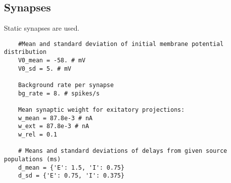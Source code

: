 \documentclass[a4paper]{article}
\begin{document}
	\subsection{Synapses}
	Static synapses are used.
	\begin{lstlisting}
	#Mean and standard deviation of initial membrane potential distribution
	V0_mean = -58. # mV
	V0_sd = 5. # mV
	
	Background rate per synapse
	bg_rate = 8. # spikes/s	
	
	Mean synaptic weight for exitatory projections:
	w_mean = 87.8e-3 # nA
	w_ext = 87.8e-3 # nA
	w_rel = 0.1
	
	# Means and standard deviations of delays from given source populations (ms)
	d_mean = {'E': 1.5, 'I': 0.75}
	d_sd = {'E': 0.75, 'I': 0.375}
	\end{lstlisting}
	
		
	
	
\end{document}

